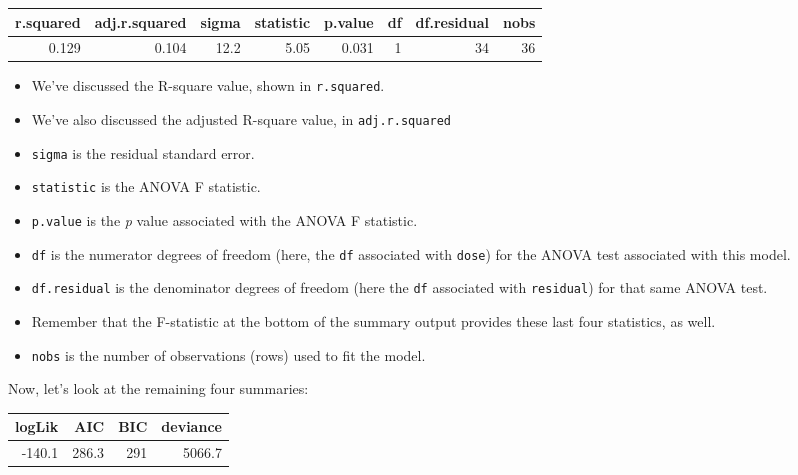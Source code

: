 \documentclass[
]{book}
\newenvironment{Shaded}{\begin{snugshade}}{\end{snugshade}}
\newcommand{\DataTypeTok}[1]{\textcolor[rgb]{0.13,0.29,0.53}{#1}}
\newcommand{\DecValTok}[1]{\textcolor[rgb]{0.00,0.00,0.81}{#1}}
\newcommand{\KeywordTok}[1]{\textcolor[rgb]{0.13,0.29,0.53}{\textbf{#1}}}
\newcommand{\NormalTok}[1]{#1}
\newcommand{\OperatorTok}[1]{\textcolor[rgb]{0.81,0.36,0.00}{\textbf{#1}}}
\newcommand{\StringTok}[1]{\textcolor[rgb]{0.31,0.60,0.02}{#1}}
\providecommand{\tightlist}{%
  \setlength{\itemsep}{0pt}\setlength{\parskip}{0pt}}
\begin{document}
\begin{tabular}{r|r|r|r|r|r|r|r}
\hline
r.squared & adj.r.squared & sigma & statistic & p.value & df & df.residual & nobs\\
\hline
0.129 & 0.104 & 12.2 & 5.05 & 0.031 & 1 & 34 & 36\\
\hline
\end{tabular}

\begin{itemize}
\tightlist
\item
  We've discussed the R-square value, shown in \texttt{r.squared}.
\item
  We've also discussed the adjusted R-square value, in \texttt{adj.r.squared}
\item
  \texttt{sigma} is the residual standard error.
\item
  \texttt{statistic} is the ANOVA F statistic.
\item
  \texttt{p.value} is the \emph{p} value associated with the ANOVA F statistic.
\item
  \texttt{df} is the numerator degrees of freedom (here, the \texttt{df} associated with \texttt{dose}) for the ANOVA test associated with this model.
\item
  \texttt{df.residual} is the denominator degrees of freedom (here the \texttt{df} associated with \texttt{residual}) for that same ANOVA test.
\item
  Remember that the F-statistic at the bottom of the summary output provides these last four statistics, as well.
\item
  \texttt{nobs} is the number of observations (rows) used to fit the model.
\end{itemize}

Now, let's look at the remaining four summaries:

\begin{Shaded}
\end{Shaded}

\begin{tabular}{r|r|r|r}
\hline
logLik & AIC & BIC & deviance\\
\hline
-140.1 & 286.3 & 291 & 5066.7\\
\hline
\end{tabular}
\end{document}
